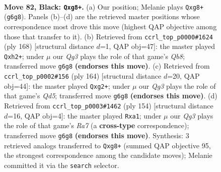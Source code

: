 \documentclass[11pt]{article}
\begin{document}
\clearpage

\begin{figure}[p]\centering
\begin{subfigure}{0.46\textwidth}\centering
\resizebox{\linewidth}{!}{%
\newchessgame
\chessboard[
  setfen={6QK/8/6q1/8/8/1k6/8/8 b - - 5 82},
  showmover=false,
  pgfstyle=straightmove, color=movearrow, markmove={g6-g8}
]}
\caption{}
\end{subfigure}\hfill
\begin{subfigure}{0.46\textwidth}\centering
\resizebox{\linewidth}{!}{%
\newchessgame
\chessboard[
  setfen={1Q6/8/8/8/8/7k/4K2q/8 w - - 17 85},
  showmover=false,
  pgfstyle=straightmove, color=movearrow, markmove={b8-h2}
]}
\caption{}
\end{subfigure}
\\[4pt]
\begin{subfigure}{0.46\textwidth}\centering
\resizebox{\linewidth}{!}{%
\newchessgame
\chessboard[
  setfen={8/8/8/3Q3p/8/2P5/3K2q1/7k w - - 9 83},
  showmover=false,
  pgfstyle=straightmove, color=movearrow, markmove={d5-g2}
]}
\caption{}
\end{subfigure}\hfill
\begin{subfigure}{0.46\textwidth}\centering
\resizebox{\linewidth}{!}{%
\newchessgame
\chessboard[
  setfen={8/R7/1K6/8/8/8/1k6/q7 w - - 0 78},
  showmover=false,
  pgfstyle=straightmove, color=movearrow, markmove={a7-a1}
]}
\caption{}
\end{subfigure}
\caption{\textbf{Move 82, Black: \texttt{Qxg8+}.} (a) Our position; Melanie plays \texttt{Qxg8+} (\texttt{g6g8}). Panels (b)--(d) are the retrieved master positions whose correspondence most drove this move (highest QAP objective among those that transfer to it). (b) Retrieved from \texttt{ccrl\_top\_p0000\#1624} (ply 168) [structural distance $d$=1, QAP obj=47]: the master played \texttt{Qxh2+}; under $\mu$ our \emph{Qg3} plays the role of that game's \emph{Qb8}; transferred move \texttt{g6g8} \textbf{(endorses this move)}. (c) Retrieved from \texttt{ccrl\_top\_p0002\#156} (ply 164) [structural distance $d$=20, QAP obj=44]: the master played \texttt{Qxg2+}; under $\mu$ our \emph{Qg3} plays the role of that game's \emph{Qd5}; transferred move \texttt{g6g8} \textbf{(endorses this move)}. (d) Retrieved from \texttt{ccrl\_top\_p0003\#1462} (ply 154) [structural distance $d$=16, QAP obj=4]: the master played \texttt{Rxa1}; under $\mu$ our \emph{Qg3} plays the role of that game's \emph{Ra7} (a \textbf{cross-type} correspondence); transferred move \texttt{g6g8} \textbf{(endorses this move)}. Synthesis: 3 retrieved analogs transferred to \texttt{Qxg8+} (summed QAP objective 95, the strongest correspondence among the candidate moves); Melanie committed it via the \texttt{search} selector.}
\label{fig:thought-m163}
\end{figure}
\end{document}
